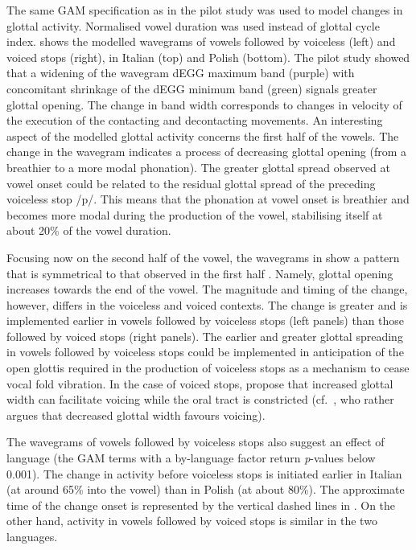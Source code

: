 \documentclass[
  11pt,
  a4paper,
]{article}
\begin{document}
The same GAM specification as in the pilot study was used to model
changes in glottal activity. Normalised vowel duration was used instead
of glottal cycle index.  shows the modelled wavegrams of
vowels followed by voiceless (left) and voiced stops (right), in Italian
(top) and Polish (bottom). The pilot study showed that a widening of the
wavegram dEGG maximum band (purple) with concomitant shrinkage of the
dEGG minimum band (green) signals greater glottal opening. The change in
band width corresponds to changes in velocity of the execution of the
contacting and decontacting movements. An interesting aspect of the
modelled glottal activity concerns the first half of the vowels. The
change in the wavegram indicates a process of decreasing glottal opening
(from a breathier to a more modal phonation). The greater glottal spread
observed at vowel onset could be related to the residual glottal spread
of the preceding voiceless stop /p/. This means that the phonation at
vowel onset is breathier and becomes more modal during the production of
the vowel, stabilising itself at about 20\% of the vowel duration.

Focusing now on the second half of the vowel, the wavegrams in
 show a pattern that is symmetrical to that observed in
the first half \citep{halle1967a}. Namely, glottal opening increases
towards the end of the vowel. The magnitude and timing of the change,
however, differs in the voiceless and voiced contexts. The change is
greater and is implemented earlier in vowels followed by voiceless stops
(left panels) than those followed by voiced stops (right panels). The
earlier and greater glottal spreading in vowels followed by voiceless
stops could be implemented in anticipation of the open glottis required
in the production of voiceless stops as a mechanism to cease vocal fold
vibration. In the case of voiced stops, \citet{halle1967a} propose that
increased glottal width can facilitate voicing while the oral tract is
constricted (cf.~\citealt{westbury1983}, who rather argues that
decreased glottal width favours voicing).

The wavegrams of vowels followed by voiceless stops also suggest an
effect of language (the GAM terms with a by-language factor return
\emph{p}-values below 0.001). The change in activity before voiceless
stops is initiated earlier in Italian (at around 65\% into the vowel)
than in Polish (at about 80\%). The approximate time of the change onset
is represented by the vertical dashed lines in . On the
other hand, activity in vowels followed by voiced stops is similar in
the two languages.
\end{document}
